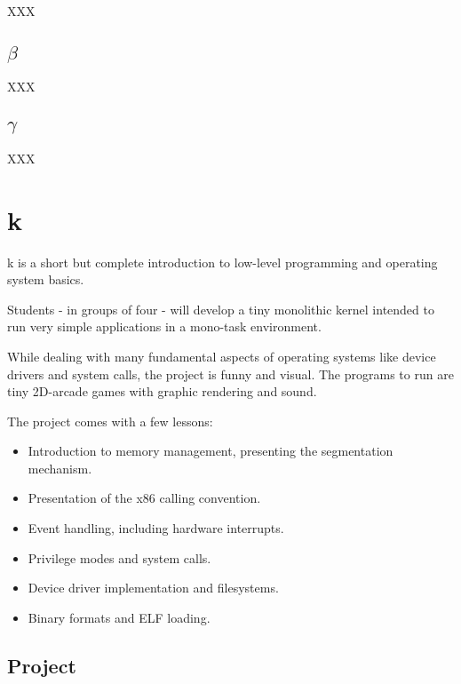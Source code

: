 \begin{multicols}{2}
XXX

%
%

\subsection{$\beta$}

XXX

%
%

\subsection{$\gamma$}

XXX

%
%

\section{k}

k is a short but complete introduction to low-level programming and
operating system basics.

Students - in groups of four - will develop a tiny monolithic kernel
intended to run very simple applications in a mono-task environment.

While dealing with many fundamental aspects of operating systems like
device drivers and system calls, the project is funny and visual. The
programs to run are tiny 2D-arcade games with graphic rendering and
sound.

The project comes with a few lessons:

\begin{itemize}
  \item
    Introduction to memory management, presenting the segmentation
    mechanism.
  \item
    Presentation of the x86 calling convention.
  \item
    Event handling, including hardware interrupts.
  \item
    Privilege modes and system calls.
  \item
    Device driver implementation and filesystems.
  \item
    Binary formats and ELF loading.
\end{itemize}

%
%

\subsection{Project}


\end{multicols}
